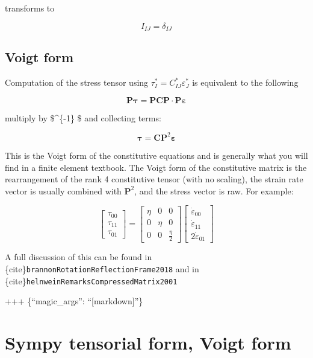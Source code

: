 \documentclass[
  letterpaper,
  DIV=11,
  numbers=noendperiod]{scrreprt}
\begin{document}
transforms to

\[I_{IJ} = \delta_{IJ}\]

\subsection{Voigt form}\label{voigt-form}

Computation of the stress tensor using
\(\tau^*_I = C^*_{IJ}\varepsilon^*_J\) is equivalent to the following

\[ \mathbf{P} \mathbf{\tau} =  \mathbf{P} \mathbf{C} \mathbf{P} \cdot \mathbf{P} \mathbf{\varepsilon} \]

multiply by \$\^{}\{-1\} \$ and collecting terms:

\[ \mathbf{\tau} = \mathbf{C} \mathbf{P}^2 \mathbf{\varepsilon} \]

This is the Voigt form of the constitutive equations and is generally
what you will find in a finite element textbook. The Voigt form of the
constitutive matrix is the rearrangement of the rank 4 constitutive
tensor (with no scaling), the strain rate vector is usually combined
with \(\mathbf{P}^2\), and the stress vector is raw. For example:

\[ \left[\begin{matrix}\tau_{0 0}\\\tau_{1 1}\\\tau_{0 1}\end{matrix}\right] =
   \left[\begin{matrix}\eta & 0 & 0\\0 & \eta & 0\\0 & 0 & \frac{\eta}{2}\end{matrix}\right]   \left[\begin{matrix}\dot\varepsilon_{0 0}\\\dot\varepsilon_{1 1}\\2 \dot\varepsilon_{0 1}\end{matrix}\right]
\]

A full discussion of this can be found in
\{cite\}\texttt{brannonRotationReflectionFrame2018} and in
\{cite\}\texttt{helnweinRemarksCompressedMatrix2001}

+++ \{``magic\_args'': ``{[}markdown{]}''\}

\section{Sympy tensorial form, Voigt
form}\label{sympy-tensorial-form-voigt-form}
\end{document}
